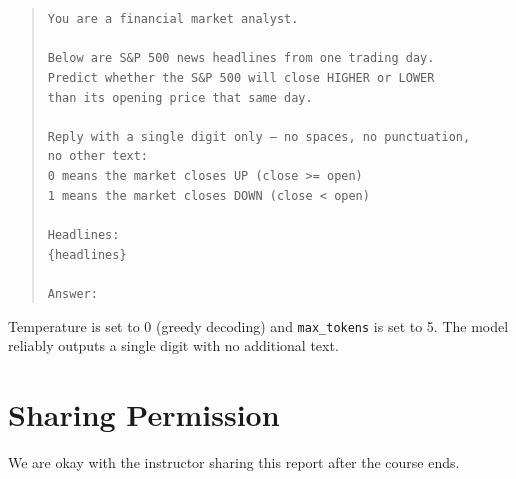 \documentclass[11pt]{article}
\begin{document}
\begin{quote}
\small
\texttt{You are a financial market analyst.}\\
\texttt{}\\
\texttt{Below are S\&P 500 news headlines from one trading day.}\\
\texttt{Predict whether the S\&P 500 will close HIGHER or LOWER}\\
\texttt{than its opening price that same day.}\\
\texttt{}\\
\texttt{Reply with a single digit only --- no spaces, no punctuation,}\\
\texttt{no other text:}\\
\texttt{0  means the market closes UP (close >= open)}\\
\texttt{1  means the market closes DOWN (close < open)}\\
\texttt{}\\
\texttt{Headlines:}\\
\texttt{\{headlines\}}\\
\texttt{}\\
\texttt{Answer:}
\end{quote}

Temperature is set to 0 (greedy decoding) and \texttt{max\_tokens} is set to 5. The model reliably outputs a single digit with no additional text.

\section*{Sharing Permission}

We are okay with the instructor sharing this report after the course ends.
\end{document}

